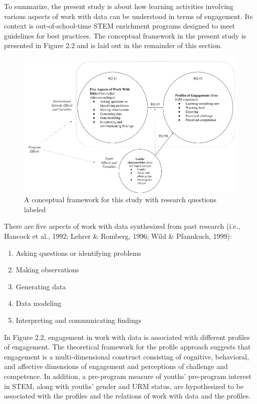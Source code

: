 \documentclass[]{book}
\providecommand{\tightlist}{%
  \setlength{\itemsep}{0pt}\setlength{\parskip}{0pt}}
\theoremstyle{definition}
\theoremstyle{definition}
\theoremstyle{definition}
\theoremstyle{remark}
\begin{document}
To summarize, the present study is about how learning activities
involving various aspects of work with data can be understood in terms
of engagement. Its context is out-of-school-time STEM enrichment
programs designed to meet guidelines for best practices. The conceptual
framework in the present study is presented in Figure 2.2 and is laid
out in the remainder of this section.

\begin{figure}

{\centering \includegraphics[width=0.8\linewidth]{images/figure2} 

}

\caption{A conceptual framework for this study with research questions labeled}\label{fig:unnamed-chunk-2}
\end{figure}

There are five aspects of work with data synthesized from past research
(i.e., Hancock et al., 1992; Lehrer \& Romberg, 1996; Wild \& Pfannkuch,
1999):

\begin{enumerate}
\def\labelenumi{\arabic{enumi}.}
\tightlist
\item
  Asking questions or identifying problems
\item
  Making observations
\item
  Generating data
\item
  Data modeling
\item
  Interpreting and communicating findings
\end{enumerate}

In Figure 2.2, engagement in work with data is associated with different
profiles of engagement. The theoretical framework for the profile
approach suggests that engagement is a multi-dimensional construct
consisting of cognitive, behavioral, and affective dimensions of
engagement and perceptions of challenge and competence. In addition, a
pre-program measure of youths' pre-program interest in STEM, along with
youths' gender and URM status, are hypothesized to be associated with
the profiles and the relations of work with data and the profiles.
\end{document}
